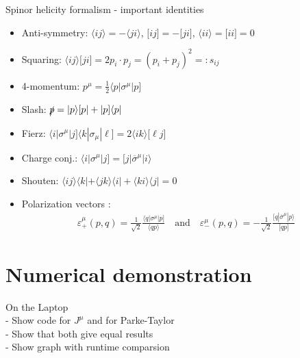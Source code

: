 \documentclass[10pt]{beamer}
\begin{document}
\begin{frame}{Spinor helicity formalism - important identities}

    \begin{itemize}[]
        \item Anti-symmetry: {\scriptsize$\langle ij \rangle = - \langle ji \rangle$}, {\scriptsize$\lbrack ij \rbrack = - \lbrack ji \rbrack$}, {\scriptsize$\langle ii \rangle = \lbrack ii \rbrack = 0$}
        \item Squaring: {\scriptsize$\langle ij \rangle \lbrack ji \rbrack = 2 p_i \cdot p_j = \left( p_i + p_j \right)^2 =: s_{ij}$}
        \item 4-momentum: {\scriptsize$p^{\mu} = \frac{1}{2} \langle p | \sigma^{\mu} | p \rbrack $}
        \item Slash: {\scriptsize$\slashed{p} = | p \rangle \lbrack p | + | p \rbrack \langle p |$}
        \item Fierz: {\scriptsize$ \langle i | \sigma^{\mu} | j \rbrack \langle k | \sigma_{\mu} | \ell \rbrack = 2 \langle ik \rangle \lbrack \ell j \rbrack$}
        \item Charge conj.: {\scriptsize$ \langle i | \sigma^{\mu} | j \rbrack = \lbrack j | \overline{\sigma}^{\mu} | i \rangle$}
        \item Shouten: {\scriptsize$ \langle ij \rangle \langle k | + \langle jk \rangle \langle i | + \langle ki \rangle \langle j | = 0$}
        \item Polarization vectors \cite{xu86}: {\scriptsize
        \begin{align*}
            \varepsilon_{+}^{\mu}(p,q) = \frac{1}{\sqrt{2}} \frac{\langle q | \sigma^{\mu} | p \rbrack }{ \langle qp \rangle } \quad \text{and} \quad \varepsilon_{-}^{\mu}(p,q) = - \frac{1}{\sqrt{2}} \frac{\lbrack q | \overline{\sigma}^{\mu} | p \rangle }{ \lbrack qp \rbrack }
        \end{align*}
        }
    \end{itemize}

\end{frame}

\section{Numerical demonstration}

{
\begin{frame}[standout]
    On the Laptop\\
    - Show code for $J^{\mu}$ and for Parke-Taylor \\
    - Show that both give equal results \\
    - Show graph with runtime comparsion
\end{frame}
}
\end{document}
